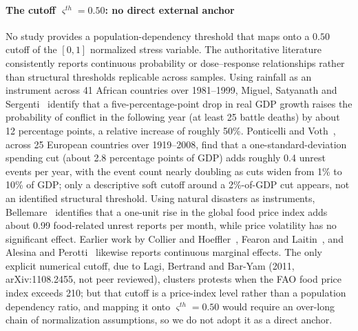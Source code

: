 \documentclass[review,12pt]{elsarticle}
\theoremstyle{plain}
\theoremstyle{definition}
\theoremstyle{remark}
\begin{document}
\paragraph{The cutoff $\varsigma^{th}=0.50$: no direct external anchor} No study provides a population-dependency threshold that maps onto a $0.50$ cutoff of the $[0,1]$ normalized stress variable. The authoritative literature consistently reports continuous probability or dose--response relationships rather than structural thresholds replicable across samples. Using rainfall as an instrument across 41 African countries over 1981--1999, Miguel, Satyanath and Sergenti~\cite{MSS2004} identify that a five-percentage-point drop in real GDP growth raises the probability of conflict in the following year (at least 25 battle deaths) by about 12 percentage points, a relative increase of roughly 50\%. Ponticelli and Voth~\cite{PV2020}, across 25 European countries over 1919--2008, find that a one-standard-deviation spending cut (about 2.8 percentage points of GDP) adds roughly 0.4 unrest events per year, with the event count nearly doubling as cuts widen from 1\% to 10\% of GDP; only a descriptive soft cutoff around a 2\%-of-GDP cut appears, not an identified structural threshold. Using natural disasters as instruments, Bellemare~\cite{Bellemare2015} identifies that a one-unit rise in the global food price index adds about 0.99 food-related unrest reports per month, while price volatility has no significant effect. Earlier work by Collier and Hoeffler~\cite{CH2004}, Fearon and Laitin~\cite{FL2003}, and Alesina and Perotti~\cite{AP1996} likewise reports continuous marginal effects. The only explicit numerical cutoff, due to Lagi, Bertrand and Bar-Yam (2011, arXiv:1108.2455, not peer reviewed), clusters protests when the FAO food price index exceeds 210; but that cutoff is a price-index level rather than a population dependency ratio, and mapping it onto $\varsigma^{th}=0.50$ would require an over-long chain of normalization assumptions, so we do not adopt it as a direct anchor.
\end{document}
